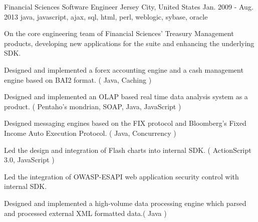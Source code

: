 \cventry
    {Financial Sciences} %
    {Software Engineer} %
    {Jersey City, United States} %
    {Jan. 2009 - Aug. 2013} %
    {java, javascript, ajax, sql, html, perl, weblogic, sybase, oracle} %
    {
        On the core engineering team of Financial Sciences' Treasury Management products, developing new applications for the suite and enhancing the underlying SDK.
    \begin{cvitems} %
        \item { Designed and implemented a forex accounting engine and a cash management engine based on BAI2 format. ( Java, Caching )}
        \item { Designed and implemented an OLAP based real time data analysis system as a product. ( Pentaho's mondrian, SOAP, Java, JavaScript )}
        \item { Designed messaging engines based on the FIX protocol and Bloomberg's Fixed Income Auto Execution Protocol. ( Java, Concurrency )}
        \item { Led the design and integration of Flash charts into internal SDK. ( ActionScript 3.0, JavaScript )}
        \item { Led the integration of OWASP-ESAPI web application security control with internal SDK.}
        \item { Designed and implemented a high-volume data processing engine which parsed and processed external XML formatted data.( Java )}
    \end{cvitems}
    }
    